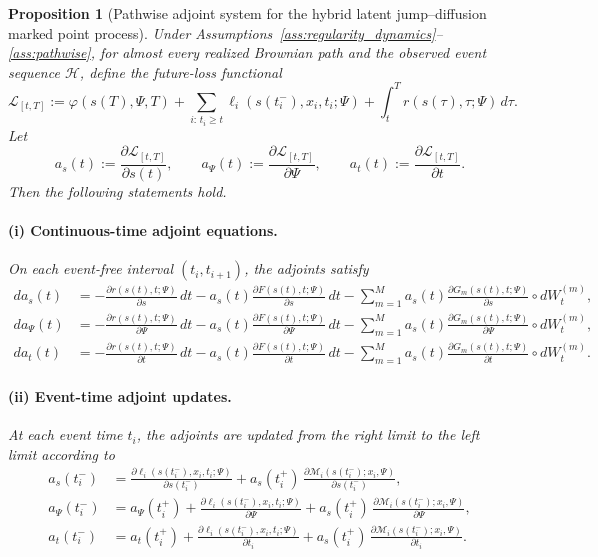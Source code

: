 \documentclass[11pt]{article}
\newtheorem{proposition}{Proposition}
\theoremstyle{definition}
\numberwithin{equation}{section}
\numberwithin{theorem}{section}
\numberwithin{proposition}{section}
\numberwithin{lemma}{section}
\numberwithin{corollary}{section}
\numberwithin{definition}{section}
\numberwithin{remark}{section}
\newcommand{\1}{\mathbbm{1}}
\begin{document}
\begin{proposition}[Pathwise adjoint system for the hybrid latent jump--diffusion marked point process]
\label{prop:adjoint_rigorous_appendix}
Under Assumptions~\ref{ass:regularity_dynamics}--\ref{ass:pathwise}, for almost every realized Brownian path and the observed event sequence $\mathcal H$, define the future-loss functional
\[
\mathcal L_{[t,T]}
:=
\varphi(s(T),\Psi,T)
+
\sum_{i:\,t_i\ge t}\ell_i(s(t_i^-),x_i,t_i;\Psi)
+
\int_t^T r(s(\tau),\tau;\Psi)\,d\tau.
\]
Let
\begin{equation}
\label{eq:app_adjoint_defs_main}
a_s(t):=\frac{\partial \mathcal L_{[t,T]}}{\partial s(t)},
\qquad
a_\Psi(t):=\frac{\partial \mathcal L_{[t,T]}}{\partial \Psi},
\qquad
a_t(t):=\frac{\partial \mathcal L_{[t,T]}}{\partial t}.
\end{equation}
Then the following statements hold.

\paragraph{(i) Continuous-time adjoint equations.}
On each event-free interval $(t_i,t_{i+1})$, the adjoints satisfy
\begin{align}
\label{eq:app_prop_state_cont}
da_s(t)
&=
-\frac{\partial r(s(t),t;\Psi)}{\partial s}\,dt
-a_s(t)\frac{\partial F(s(t),t;\Psi)}{\partial s}\,dt
-\sum_{m=1}^{M}
a_s(t)\frac{\partial G_m(s(t),t;\Psi)}{\partial s}\circ dW_t^{(m)},\\
\label{eq:app_prop_param_cont}
da_\Psi(t)
&=
-\frac{\partial r(s(t),t;\Psi)}{\partial \Psi}\,dt
-a_s(t)\frac{\partial F(s(t),t;\Psi)}{\partial \Psi}\,dt
-\sum_{m=1}^{M}
a_s(t)\frac{\partial G_m(s(t),t;\Psi)}{\partial \Psi}\circ dW_t^{(m)},\\
\label{eq:app_prop_time_cont}
da_t(t)
&=
-\frac{\partial r(s(t),t;\Psi)}{\partial t}\,dt
-a_s(t)\frac{\partial F(s(t),t;\Psi)}{\partial t}\,dt
-\sum_{m=1}^{M}
a_s(t)\frac{\partial G_m(s(t),t;\Psi)}{\partial t}\circ dW_t^{(m)}.
\end{align}

\paragraph{(ii) Event-time adjoint updates.}
At each event time $t_i$, the adjoints are updated from the right limit to the left limit according to
\begin{align}
\label{eq:app_prop_state_jump}
a_s(t_i^-)
&=
\frac{\partial \ell_i(s(t_i^-),x_i,t_i;\Psi)}{\partial s(t_i^-)}
+
a_s(t_i^+)\,
\frac{\partial \mathcal M_i(s(t_i^-);x_i,\Psi)}{\partial s(t_i^-)},\\
\label{eq:app_prop_param_jump}
a_\Psi(t_i^-)
&=
a_\Psi(t_i^+)
+
\frac{\partial \ell_i(s(t_i^-),x_i,t_i;\Psi)}{\partial \Psi}
+
a_s(t_i^+)\,
\frac{\partial \mathcal M_i(s(t_i^-);x_i,\Psi)}{\partial \Psi},\\
\label{eq:app_prop_time_jump}
a_t(t_i^-)
&=
a_t(t_i^+)
+
\frac{\partial \ell_i(s(t_i^-),x_i,t_i;\Psi)}{\partial t_i}
+
a_s(t_i^+)\,
\frac{\partial \mathcal M_i(s(t_i^-);x_i,\Psi)}{\partial t_i}.
\end{align}


\end{proposition}
\end{document}
